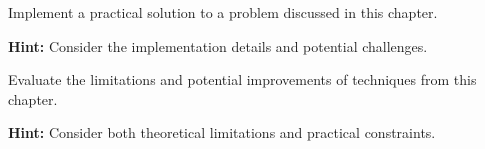\begin{problem}
Implement a practical solution to a problem discussed in this chapter.

\textbf{Hint:} Consider the implementation details and potential challenges.
\end{problem}

\begin{problem}
Evaluate the limitations and potential improvements of techniques from this chapter.

\textbf{Hint:} Consider both theoretical limitations and practical constraints.
\end{problem}
